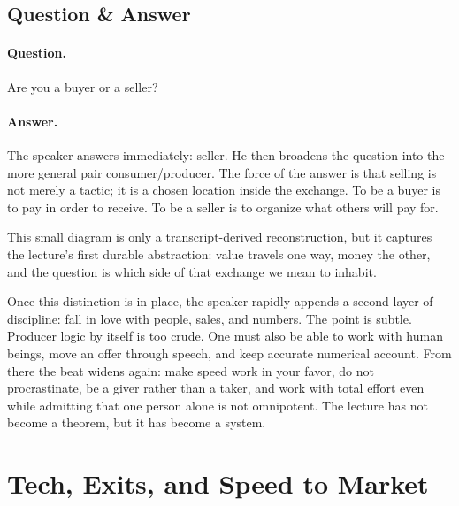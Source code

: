 \subsection{Question \& Answer}

\paragraph{Question.} Are you a buyer or a seller?

\paragraph{Answer.} The speaker answers immediately: seller. He then broadens the question into the more general pair consumer/producer. The force of the answer is that selling is not merely a tactic; it is a chosen location inside the exchange. To be a buyer is to pay in order to receive. To be a seller is to organize what others will pay for.

\begin{figure}[h]
\centering
{}
\end{figure}

This small diagram is only a transcript-derived reconstruction, but it captures the lecture's first durable abstraction: value travels one way, money the other, and the question is which side of that exchange we mean to inhabit.

Once this distinction is in place, the speaker rapidly appends a second layer of discipline: fall in love with people, sales, and numbers. The point is subtle. Producer logic by itself is too crude. One must also be able to work with human beings, move an offer through speech, and keep accurate numerical account. From there the beat widens again: make speed work in your favor, do not procrastinate, be a giver rather than a taker, and work with total effort even while admitting that one person alone is not omnipotent. The lecture has not become a theorem, but it has become a system.

\section{Tech, Exits, and Speed to Market}

